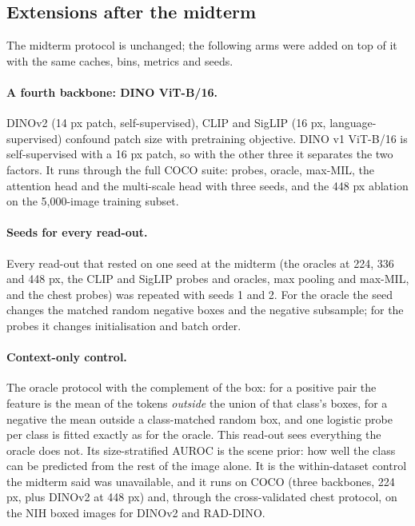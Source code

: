 \documentclass[10pt,letterpaper,twocolumn]{article}
\begin{document}
\subsection{Extensions after the midterm}
\label{sec:ext-setup}
The midterm protocol is unchanged; the following arms were added on top of it with the same
caches, bins, metrics and seeds.

\paragraph{A fourth backbone: DINO ViT-B/16.}
DINOv2 (14 px patch, self-supervised), CLIP and SigLIP (16 px, language-supervised) confound
patch size with pretraining objective. DINO v1 ViT-B/16 \citep{caron2021dino} is
self-supervised with a 16 px patch, so with the other three it separates the two factors.
It runs through the full COCO suite: probes, oracle, max-MIL, the attention head and the
multi-scale head with three seeds, and the 448 px ablation on the 5,000-image training subset.

\paragraph{Seeds for every read-out.}
Every read-out that rested on one seed at the midterm (the oracles at 224, 336 and 448 px,
the CLIP and SigLIP probes and oracles, max pooling and max-MIL, and the chest probes) was
repeated with seeds 1 and 2. For the oracle the seed changes the matched random negative
boxes and the negative subsample; for the probes it changes initialisation and batch order.

\paragraph{Context-only control.}
The oracle protocol with the complement of the box: for a positive pair the feature is the
mean of the tokens \emph{outside} the union of that class's boxes, for a negative the mean
outside a class-matched random box, and one logistic probe per class is fitted exactly as for
the oracle. This read-out sees everything the oracle does not. Its size-stratified AUROC is the
scene prior: how well the class can be predicted from the rest of the image alone. It is the
within-dataset control the midterm said was unavailable, and it runs on COCO (three backbones,
224 px, plus DINOv2 at 448 px) and, through the cross-validated chest protocol, on the NIH
boxed images for DINOv2 and RAD-DINO.
\end{document}
